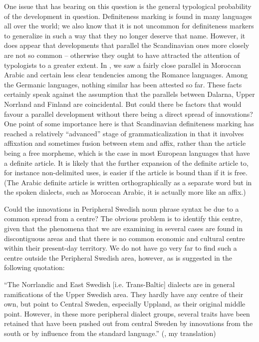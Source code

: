One issue that has bearing on this question is the general typological probability of the development in question. Definiteness marking is found in many languages all over the world; we also know that it is not uncommon for definiteness markers to generalize in such a way that they no longer deserve that name. However, it does appear that developments that parallel the Scandinavian ones more closely are not so common – otherwise they ought to have attracted the attention of typologists to a greater extent. In , we saw a fairly close parallel in Moroccan Arabic and certain less clear tendencies among the Romance languages. Among the Germanic languages, nothing similar has been attested so far. These facts certainly speak against the assumption that the parallels between Dalarna, Upper Norrland and Finland are coincidental. But could there be factors that would favour a parallel development without there being a direct spread of innovations? One point of some importance here is that Scandinavian definiteness marking has reached a relatively “advanced” stage of grammaticalization in that it involves affixation and sometimes fusion between stem and affix, rather than the article being a free morpheme, which is the case in most European languages that have a definite article. It is likely that the further expansion of the definite article to, for instance non-delimited uses, is easier if the article is bound than if it is free. (The Arabic definite article is written orthographically as a separate word but in the spoken dialects, such as Moroccan Arabic, it is actually more like an affix.) 

Could the innovations in Peripheral Swedish noun phrase syntax be due to a common spread from a centre? The obvious problem is to identify this centre, given that the phenomena that we are examining in several cases are found in discontiguous areas and that there is no common economic and cultural centre within their present-day territory. We do not have go very far to find such a centre outside the Peripheral Swedish area, however, as is suggested in the following quotation: 

“The Norrlandic and East Swedish [i.e. Trans-Baltic] dialects are in general ramifications of the Upper Swedish area. They hardly have any centre of their own, but point to Central Sweden, especially Uppland, as their original middle point. However, in these more peripheral dialect groups, several traits have been retained that have been pushed out from central Sweden by innovations from the south or by influence from the standard language.” (\citealt[51]{Wessén1966}, my translation)

